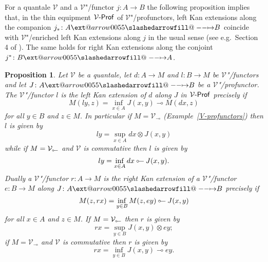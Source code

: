 \documentclass[preprint, a4paper]{elsarticle}
\makeatletter
\def\slashedarrowfill@#1#2#3#4#5{%
  $\m@th\thickmuskip0mu\medmuskip\thickmuskip\thinmuskip\thickmuskip
   \relax#5#1\mkern-7mu%
   \cleaders\hbox{$#5\mkern-2mu#2\mkern-2mu$}\hfill
   \mathclap{#3}\mathclap{#2}%
   \cleaders\hbox{$#5\mkern-2mu#2\mkern-2mu$}\hfill
   \mkern-7mu#4$%
}
\def\rightslashedarrowfill@{%
  \slashedarrowfill@\relbar\relbar\mapstochar\rightarrow}
\newcommand\xslashedrightarrow[2][]{%
  \ext@arrow 0055{\rightslashedarrowfill@}{#1}{#2}}
\def\slashedrightarrow{\xslashedrightarrow{}}
\newcommand{\dashcirc}{\multimap}
\newcommand{\circdash}{\mathbin{\text{\reflectbox{$\multimap$}}}}
\newtheorem{proposition}[theorem]{Proposition}
\theoremstyle{definition}
\theoremstyle{remark}
\providecommand{\exref}[1]{Example~\ref{#1}}
\providecommand{\tens}{\otimes}
\providecommand{\map}[3]{#1\colon#2\to#3}
\providecommand{\hmap}[3]{#1\colon#2\slashedrightarrow#3}
\providecommand{\catvar}[1]{\mathcal{#1}}
\providecommand{\2}{\mathsf 2}
\providecommand{\V}{\catvar V}
\providecommand{\Prof}{\mathsf{Prof}}
\providecommand{\enProf}[1]{#1\text-\Prof}
\makeatother
\begin{document}
  For a quantale $\V$ and a $\V$"/functor $\map jAB$ the following proposition implies that, in the thin equipment $\enProf\V$ of $\V$"/profunctors, left Kan extensions along the companion $\hmap{j_*}AB$ coincide with $\V$"/enriched left Kan extensions along $j$ in the usual sense (see e.g.\ Section 4 of \cite{Kelly82}). The same holds for right Kan extensions along the conjoint $\hmap{j^*}BA$.
  \begin{proposition}\label{Kan extension expression}
  	Let $\V$ be a quantale, let $\map dAM$ and $\map lBM$ be $\V$"/functors and let $\hmap JAB$ be a $\V$"/profunctor. The $\V$"/functor $l$ is the left Kan extension of $d$ along $J$ in $\enProf\V$ precisely if
  	\begin{equation} \label{defining equation}
  		M(ly, z) = \inf_{x \in A} J(x,y) \dashcirc M(dx, z)
  	\end{equation}
  	for all $y \in B$ and $z \in M$. In particular if $M = \V_{\dashcirc}$ (\exref{V-profunctors}) then $l$ is given by
  	\begin{displaymath}
  		ly = \sup_{x \in A} dx \tens J(x,y)
  	\end{displaymath}
  	while if $M = \V_{\circdash}$ and $\V$ is commutative then $l$ is given by
  	\begin{displaymath}
  		ly = \inf_{x \in A} dx \circdash J(x,y).
  	\end{displaymath}
  	Dually a $\V$"/functor $\map rAM$ is the right Kan extension of a $\V$"/functor $\map eBM$ along $\hmap JAB$ precisely if
  	\begin{displaymath}
  		M(z, rx) = \inf_{y \in B} M(z, ey) \circdash J(x, y)
  	\end{displaymath}
  	for all $x \in A$ and $z \in M$. If $M = \V_{\circdash}$ then $r$ is given by
  	\begin{displaymath}
  		rx = \sup_{y \in B} J(x,y) \tens ey;
  	\end{displaymath}
  	if $M = \V_{\dashcirc}$ and $\V$ is commutative then $r$ is given by
  	\begin{displaymath}
  		rx = \inf_{y \in B} J(x,y) \dashcirc ey.
  	\end{displaymath}
  \end{proposition}
\end{document}
